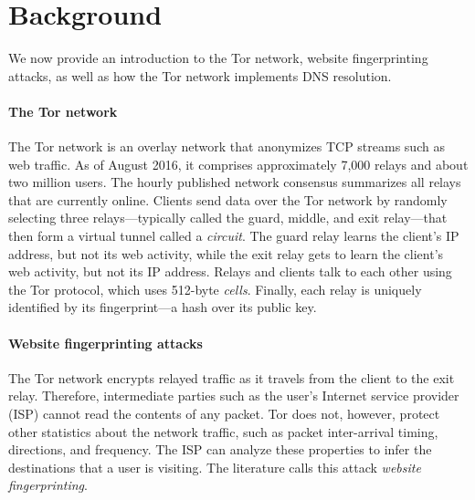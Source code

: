 \section{Background}
\label{sec:background}
We now provide an introduction to the Tor network, website fingerprinting
attacks, as well as how the Tor network implements DNS resolution.

\paragraph{The Tor network}
The Tor network is an overlay network that anonymizes TCP streams such as web
traffic.  As of August 2016, it comprises approximately 7,000 relays and about two
million users.  The hourly published network consensus summarizes all relays
that are currently online.  Clients send data over the Tor network by randomly
selecting three relays---typically called the guard, middle, and exit
relay---that then form a virtual tunnel called a \emph{circuit}.  The guard
relay learns the client's IP address, but not its web activity, while the exit
relay gets to learn the client's web activity, but not its IP address.  Relays
and clients talk to each other using the Tor protocol, which uses 512-byte
\emph{cells}.  Finally, each relay is uniquely identified by its fingerprint---a
hash over its public key.

\paragraph{Website fingerprinting attacks}
The Tor network encrypts relayed traffic as it travels from the client
to the exit relay.  Therefore, intermediate parties such as the user's
Internet service provider (ISP) cannot read the contents of any packet.
Tor does not, however, protect other statistics about the network
traffic, such as packet inter-arrival timing, directions, and frequency.
The ISP can analyze these properties to infer the destinations that a
user is visiting.  The literature calls this attack \emph{website
fingerprinting}.

